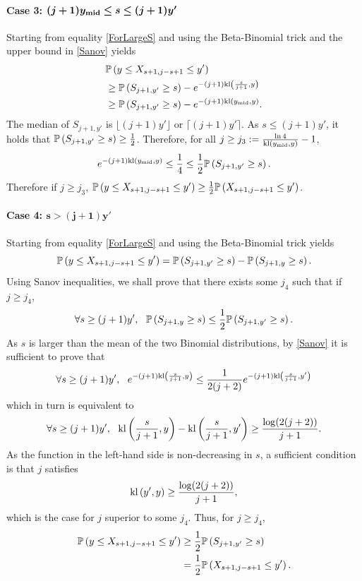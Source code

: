 \paragraph{Case 3: $\bm{(j+1)y_{\mathrm{mid}} \leq s \leq (j+1)y'}$} Starting from equality \eqref{ForLargeS} and using the Beta-Binomial trick and the upper bound in \eqref{Sanov} yields 
\begin{align*}
& \mathbb{P}\left(y \leq X_{s+1,j-s+1} \leq y'\right)
\\ & \geq \mathbb{P}\left(S_{j+1,y'} \geq s\right) - e^{-(j+1)\mathrm{kl}\left(\frac{s}{j+1} , y\right)}
\\ & \geq \mathbb{P}\left(S_{j+1,y'} \geq s\right) - e^{-(j+1)\mathrm{kl}\left(y_{\mathrm{mid}} , y\right)}. 
\end{align*}
The median of $S_{j+1,y'}$ is $\lfloor(j+1)y'\rfloor$ or $\lceil(j+1)y'\rceil$. As $s \leq  (j+1)y'$, it holds that $\mathbb{P}\left(S_{j+1,y'} \geq s\right) \geq \frac{1}{2}$. Therefore, for all $j \geq j_3 := \frac{\ln 4}{\mathrm{kl}(y_{\mathrm{mid}},y)}-1$, 
\[e^{-(j+1)\mathrm{kl}\left(y_{\mathrm{mid}} , y\right)} \leq \frac{1}{4} \leq \frac{1}{2}\mathbb{P}\left(S_{j+1,y'} \geq s\right).\]
Therefore if $j \geq j_3$, $\mathbb{P}\left(y \leq X_{s+1,j-s+1} \leq y'\right)  \geq \frac{1}{2}\mathbb{P}\left(X_{s+1,j-s+1} \leq y'\right)$.

\paragraph{Case 4: $\bm{s > (j+1)y'}$} Starting from equality \eqref{ForLargeS} and using the Beta-Binomial trick yields  
\[\mathbb{P}\left(y \leq X_{s+1,j-s+1} \leq y'\right)  =  \mathbb{P}\left(S_{j+1,y'} \geq s\right) - \mathbb{P}\left(S_{j+1,y} \geq s\right).\]
Using Sanov inequalities, we shall prove that there exists some $j_4$ such that if $j\geq j_4$, 
\[\forall s \geq (j+1)y', \ \ \bP\left(S_{j+1,y} \geq s\right) \leq \frac{1}{2}\bP\left(S_{j+1,y'} \geq s\right).\]
As $s$ is larger than the mean of the two Binomial distributions, by \eqref{Sanov} it is sufficient to prove that 
\[\forall s \geq (j+1)y', \ \ e^{-(j+1)\kl\left(\frac{s}{j+1} , y\right)} \leq \frac{1}{2(j+2)}e^{-(j+1)\kl\left(\frac{s}{j+1} , y'\right)}\]
which in turn is equivalent to 
\[\forall s \geq (j+1)y', \ \ \mathrm{kl}\left(\frac{s}{j+1} , y\right)  -  \mathrm{kl}\left(\frac{s}{j+1} , y'\right) \geq \frac{\log(2(j+2))}{j+1}.\]
As the function in the left-hand side is non-decreasing in $s$, a sufficient condition is that $j$ satisfies 
\[ \mathrm{kl}\left(y' , y\right)\geq \frac{\log(2(j+2))}{j+1},\]
which is the case for $j$ superior to some $j_4$. Thus, for $j\geq j_4$, 
\begin{align*}
\mathbb{P}\left(y \leq X_{s+1,j-s+1} \leq y'\right) 
&\geq \frac{1}{2}\mathbb{P}\left(S_{j+1,y'} \geq s\right) 
\\ &= \frac{1}{2}\mathbb{P}\left(X_{s+1,j-s+1} \leq y'\right).
\end{align*}


